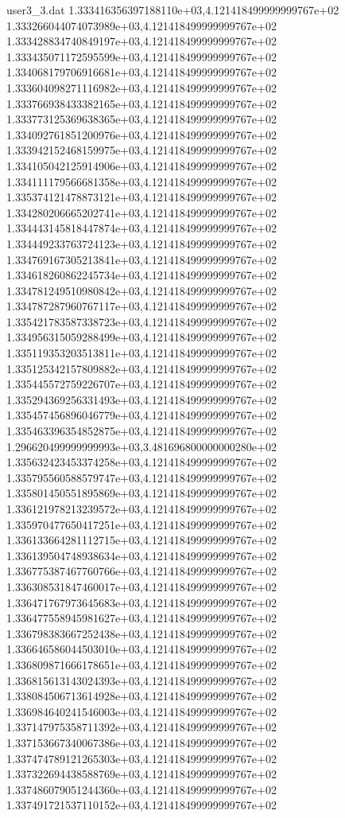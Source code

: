 \begin{filecontents}{user3_3.dat}
1.333416356397188110e+03,4.121418499999999767e+02
1.333266044074073989e+03,4.121418499999999767e+02
1.333428834740849197e+03,4.121418499999999767e+02
1.333435071172595599e+03,4.121418499999999767e+02
1.334068179706916681e+03,4.121418499999999767e+02
1.333604098271116982e+03,4.121418499999999767e+02
1.333766938433382165e+03,4.121418499999999767e+02
1.333773125369638365e+03,4.121418499999999767e+02
1.334092761851200976e+03,4.121418499999999767e+02
1.333942152468159975e+03,4.121418499999999767e+02
1.334105042125914906e+03,4.121418499999999767e+02
1.334111179566681358e+03,4.121418499999999767e+02
1.335374121478873121e+03,4.121418499999999767e+02
1.334280206665202741e+03,4.121418499999999767e+02
1.334443145818447874e+03,4.121418499999999767e+02
1.334449233763724123e+03,4.121418499999999767e+02
1.334769167305213841e+03,4.121418499999999767e+02
1.334618260862245734e+03,4.121418499999999767e+02
1.334781249510980842e+03,4.121418499999999767e+02
1.334787287960767117e+03,4.121418499999999767e+02
1.335421783587338723e+03,4.121418499999999767e+02
1.334956315059288499e+03,4.121418499999999767e+02
1.335119353203513811e+03,4.121418499999999767e+02
1.335125342157809882e+03,4.121418499999999767e+02
1.335445572759226707e+03,4.121418499999999767e+02
1.335294369256331493e+03,4.121418499999999767e+02
1.335457456896046779e+03,4.121418499999999767e+02
1.335463396354852875e+03,4.121418499999999767e+02
1.296620499999999993e+03,3.481696800000000280e+02
1.335632423453374258e+03,4.121418499999999767e+02
1.335795560588579747e+03,4.121418499999999767e+02
1.335801450551895869e+03,4.121418499999999767e+02
1.336121978213239572e+03,4.121418499999999767e+02
1.335970477650417251e+03,4.121418499999999767e+02
1.336133664281112715e+03,4.121418499999999767e+02
1.336139504748938634e+03,4.121418499999999767e+02
1.336775387467760766e+03,4.121418499999999767e+02
1.336308531847460017e+03,4.121418499999999767e+02
1.336471767973645683e+03,4.121418499999999767e+02
1.336477558945981627e+03,4.121418499999999767e+02
1.336798383667252438e+03,4.121418499999999767e+02
1.336646586044503010e+03,4.121418499999999767e+02
1.336809871666178651e+03,4.121418499999999767e+02
1.336815613143024393e+03,4.121418499999999767e+02
1.338084506713614928e+03,4.121418499999999767e+02
1.336984640241546003e+03,4.121418499999999767e+02
1.337147975358711392e+03,4.121418499999999767e+02
1.337153667340067386e+03,4.121418499999999767e+02
1.337474789121265303e+03,4.121418499999999767e+02
1.337322694438588769e+03,4.121418499999999767e+02
1.337486079051244360e+03,4.121418499999999767e+02
1.337491721537110152e+03,4.121418499999999767e+02

\end{filecontents}
